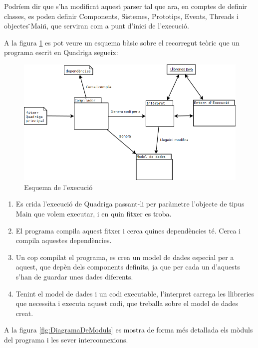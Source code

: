   Podríem dir que s'ha modificat aquest parser tal que ara, en comptes de definir classes, es poden definir Components, Sistemes, Prototips, Events, Threads i objectes \"{}Main\"{}, que serviran com a punt d'inici de l'execució.
  
  A la figura \ref{fig:EsquemaExecucio} es pot veure un esquema bàsic sobre el recorregut teòric que un programa escrit en Quadriga segueix:
  
  \begin{figure}
    \includegraphics[width=1\linewidth]{./img/EsquemaExecucio.png}
    \caption{Esquema de l'execució \label{fig:EsquemaExecucio}}
  \end{figure}
  
  \begin{enumerate}
    \item Es crida l'execució de Quadriga passant-li per paràmetre l'objecte de tipus Main que volem executar, i en quin fitxer es troba.
    \item El programa compila aquest fitxer i cerca quines dependències té. Cerca i compila aquestes dependències.
    \item Un cop compilat el programa, es crea un model de dades especial per a aquest, que depèn dels components definits, ja que per cada un d'aquests s'han de guardar unes dades diferents.
    \item Tenint el model de dades i un codi executable, l'interpret carrega les llibreries que necessita i executa aquest codi, que treballa sobre el model de dades creat.
  \end{enumerate}
  
  A la figura \ref{fig:DiagramaDeModuls} es mostra de forma més detallada els mòduls del programa i les sever interconnexions.

